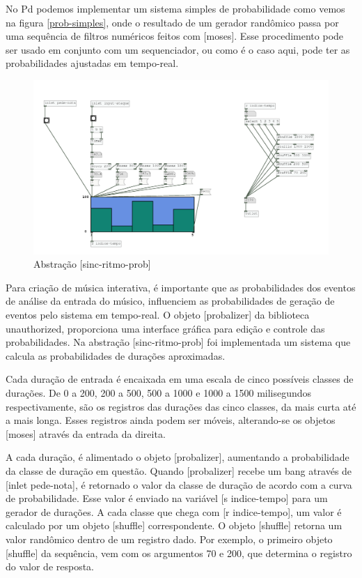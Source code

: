\documentclass{ppgmus}
\begin{document}
No Pd podemos implementar um sistema simples de probabilidade como 
vemos na figura \ref{prob-simples}, onde o resultado de um gerador
randômico passa por uma sequência de filtros numéricos feitos
com [moses]. Esse procedimento pode ser usado em conjunto com um sequenciador,
ou como é o caso aqui, pode ter as probabilidades ajustadas em tempo-real.

\begin{figure}
\includegraphics[scale=.6]{sinc-ritmo-prob}
\caption{Abstração [sinc-ritmo-prob]}
\label{sinc-ritmo-prob}
\end{figure}

Para criação de música interativa, é importante que as probabilidades
dos eventos de análise da entrada do músico, influenciem as probabilidades
de geração de eventos pelo sistema em tempo-real.
O objeto [probalizer] da biblioteca unauthorized, proporciona
uma interface gráfica para edição e controle das probabilidades.
Na abstração [sinc-ritmo-prob] foi implementada um sistema
que calcula as probabilidades de durações aproximadas.

Cada duração de entrada é encaixada em uma escala de cinco possíveis
classes de durações. De 0 a 200, 200 a 500, 500 a 1000 e 1000 a 1500 milisegundos
respectivamente, são os registros das durações das cinco classes,
da mais curta até a mais longa. 
Esses registros ainda podem ser móveis, alterando-se os objetos [moses]
através da entrada da direita.


A cada duração, é alimentado o objeto [probalizer], aumentando
a probabilidade da classe de duração em questão.
Quando [probalizer] recebe um bang através de [inlet pede-nota],
é retornado o valor da classe de duração de acordo com a curva
de probabilidade. Esse valor é enviado na variável [s indice-tempo]
para um gerador de durações. A cada classe que chega com [r indice-tempo],
um valor é calculado por um objeto [shuffle] correspondente. O objeto
[shuffle] retorna um valor randômico dentro de um registro dado. Por exemplo,
o primeiro objeto [shuffle] da sequência, vem com os argumentos 70 e 200, que determina
o registro do valor de resposta. 
\end{document}
